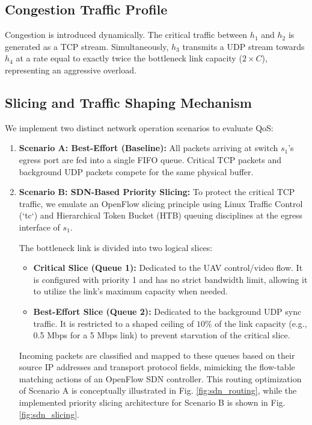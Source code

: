 \documentclass[conference]{IEEEtran}
\begin{document}
\subsection{Congestion Traffic Profile}
Congestion is introduced dynamically. The critical traffic between $h_1$ and $h_2$ is generated as a TCP stream. Simultaneously, $h_3$ transmits a UDP stream towards $h_4$ at a rate equal to exactly twice the bottleneck link capacity ($2 \times C$), representing an aggressive overload.

\subsection{Slicing and Traffic Shaping Mechanism}
We implement two distinct network operation scenarios to evaluate QoS:
\begin{enumerate}
    \item \textbf{Scenario A: Best-Effort (Baseline):} All packets arriving at switch $s_1$'s egress port are fed into a single FIFO queue. Critical TCP packets and background UDP packets compete for the same physical buffer.
    \item \textbf{Scenario B: SDN-Based Priority Slicing:} To protect the critical TCP traffic, we emulate an OpenFlow slicing principle using Linux Traffic Control (`tc`) and Hierarchical Token Bucket (HTB) queuing disciplines at the egress interface of $s_1$. 
    
    The bottleneck link is divided into two logical slices:
    \begin{itemize}
        \item \textbf{Critical Slice (Queue 1):} Dedicated to the UAV control/video flow. It is configured with priority 1 and has no strict bandwidth limit, allowing it to utilize the link's maximum capacity when needed.
        \item \textbf{Best-Effort Slice (Queue 2):} Dedicated to the background UDP sync traffic. It is restricted to a shaped ceiling of $10\%$ of the link capacity (e.g., 0.5 Mbps for a 5 Mbps link) to prevent starvation of the critical slice.
    \end{itemize}
    Incoming packets are classified and mapped to these queues based on their source IP addresses and transport protocol fields, mimicking the flow-table matching actions of an OpenFlow SDN controller. This routing optimization of Scenario A is conceptually illustrated in Fig. \ref{fig:sdn_routing}, while the implemented priority slicing architecture for Scenario B is shown in Fig. \ref{fig:sdn_slicing}.
\end{enumerate}
\end{document}
